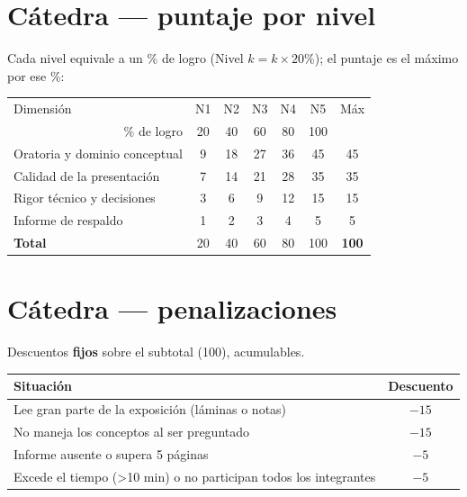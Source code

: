 \documentclass[11pt,letterpaper]{article}
\begin{document}
\section*{Cátedra --- puntaje por nivel}
Cada nivel equivale a un \% de logro (Nivel $k = k\times 20\%$); el puntaje es el máximo por ese \%:
\begin{center}\small
\begin{tabular}{l ccccc c}
\toprule
Dimensión & N1 & N2 & N3 & N4 & N5 & Máx \\
\multicolumn{1}{r}{\footnotesize \% de logro} & 20 & 40 & 60 & 80 & 100 & \\
\midrule
Oratoria y dominio conceptual & 9 & 18 & 27 & 36 & 45 & 45 \\
Calidad de la presentación & 7 & 14 & 21 & 28 & 35 & 35 \\
Rigor técnico y decisiones & 3 & 6 & 9 & 12 & 15 & 15 \\
Informe de respaldo & 1 & 2 & 3 & 4 & 5 & 5 \\
\midrule
\textbf{Total} & 20 & 40 & 60 & 80 & 100 & \textbf{100} \\
\bottomrule
\end{tabular}\end{center}
\section*{Cátedra --- penalizaciones}
Descuentos \textbf{fijos} sobre el subtotal (100), acumulables.
\begin{center}\small
\begin{tabular}{p{11cm} c}
\toprule
Situación & Descuento \\
\midrule
Lee gran parte de la exposición (láminas o notas) & $-15$ \\
No maneja los conceptos al ser preguntado & $-15$ \\
Informe ausente o supera 5 páginas & $-5$ \\
Excede el tiempo (>10 min) o no participan todos los integrantes & $-5$ \\
\bottomrule
\end{tabular}\end{center}
\clearpage
\end{document}
